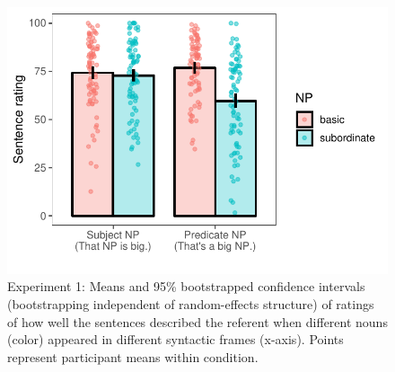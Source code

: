 \documentclass[10pt,letterpaper]{article}
\begin{document}
\begin{figure}[t]
\begin{center}
\includegraphics[width=\linewidth]{expt-syntax-rating-prereg-bars.pdf}
\end{center}
\vspace{-1cm}
\caption{Experiment 1: Means and 95\% bootstrapped confidence intervals (bootstrapping independent of random-effects structure) of ratings of how well the sentences described the referent when different nouns (color) appeared in different syntactic frames (x-axis).  Points represent participant means within condition.
}
\label{syntax-rating}
\end{figure}
\end{document}
